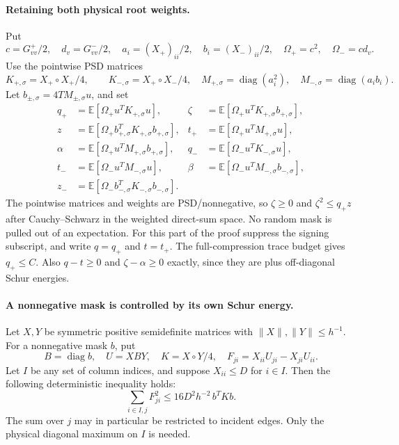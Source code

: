 \documentclass[10pt]{article}
\numberwithin{equation}{section}
\newcommand{\1}{\mathbf1}
\begin{document}
\paragraph{Retaining both physical root weights.}
Put
\[
 c=G^+_{vv}/2,\quad d_v=G^-_{vv}/2,\quad
 a_i=(X_+)_{ii}/2,\quad b_i=(X_-)_{ii}/2,
 \quad \Omega_+=c^2,\quad\Omega_-=cd_v.
\]
Use the pointwise PSD matrices
\[
 K_{+,\sigma}=X_+\circ X_+/4,\qquad
 K_{-,\sigma}=X_+\circ X_-/4,
 \quad M_{+,\sigma}=\operatorname{diag}(a_i^2),\quad
 M_{-,\sigma}=\operatorname{diag}(a_ib_i).
\]
Let $b_{\pm,\sigma}=4TM_{\pm,\sigma}u$, and set
\[
 \begin{aligned}
 q_+&=\mathbb E[\Omega_+u^TK_{+,\sigma}u],&
 \zeta&=\mathbb E[\Omega_+u^TK_{+,\sigma}b_{+,\sigma}],\\
 z&=\mathbb E[\Omega_+b_{+,\sigma}^TK_{+,\sigma}b_{+,\sigma}],&
 t_+&=\mathbb E[\Omega_+u^TM_{+,\sigma}u],\\
 \alpha&=\mathbb E[\Omega_+u^TM_{+,\sigma}b_{+,\sigma}],&
 q_-&=\mathbb E[\Omega_-u^TK_{-,\sigma}u],\\
 t_-&=\mathbb E[\Omega_-u^TM_{-,\sigma}u],&
 \beta&=\mathbb E[\Omega_-u^TM_{-,\sigma}b_{-,\sigma}],\\
 z_-&=\mathbb E[\Omega_-b_{-,\sigma}^TK_{-,\sigma}b_{-,\sigma}].
 \end{aligned}
\]
The pointwise matrices and weights are PSD/nonnegative, so
$\zeta\ge0$ and $\zeta^2\le q_+z$ after Cauchy--Schwarz in the
weighted direct-sum space. No random mask is pulled out of an expectation.
For this part of the proof suppress the signing subscript, and write
$q=q_+$ and $t=t_+$. The full-compression trace budget gives $q_+\le C$.
Also $q-t\ge0$ and $\zeta-\alpha\ge0$ exactly, since they are
plus off-diagonal Schur energies.

\paragraph{A nonnegative mask is controlled by its own Schur energy.}
Let $X,Y$ be symmetric positive semidefinite matrices with
$\|X\|,\|Y\|\le h^{-1}$. For a nonnegative mask $b$, put
\[
 B=\operatorname{diag}b,\quad U=XBY,\quad
 K=X\circ Y/4,\quad F_{ji}=X_{ii}U_{ji}-X_{ji}U_{ii}.
\]
Let $I$ be any set of column indices, and suppose $X_{ii}\le D$
for $i\in I$. Then the following deterministic inequality holds:
\[
 \boxed{\quad
 \sum_{i\in I,j}F_{ji}^2
       \le16D^2h^{-2}\,b^TKb.
 \quad}                                                   \tag{BM1}
\]
The sum over $j$ may in particular be restricted to incident edges.
Only the physical diagonal maximum on $I$ is needed.
\end{document}
